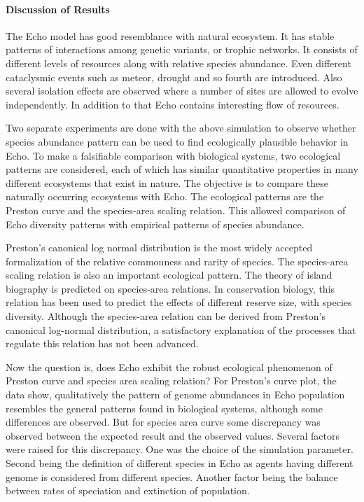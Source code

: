 \documentclass[letterpaper]{article}
\numberwithin{equation}{section}
\begin{document}
\paragraph{Discussion of Results}
The Echo model has good resemblance with natural ecosystem. It has stable patterns of interactions among genetic variants, or trophic networks. It consists of different levels of resources along with relative species abundance. Even different cataclysmic events such as meteor, drought and so fourth are introduced. Also several isolation effects are observed where a number of sites are allowed to evolve independently. In addition to that Echo contains interesting flow of resources. 

Two separate experiments are done with the above simulation to observe whether species abundance pattern can be used to find ecologically plausible behavior in Echo. To make a falsifiable comparison with biological systems, two ecological patterns are considered, each of which has similar quantitative properties in many different ecosystems that exist in nature. The objective is to compare these naturally occurring ecosystems with Echo. The ecological patterns are the Preston  curve and the species-area scaling relation. This allowed comparison of Echo diversity patterns with empirical patterns of species abundance.

Preston's canonical log normal distribution is the most widely accepted formalization of the relative commonness and rarity of species. The species-area scaling relation is also an important ecological pattern. The theory of island biography is predicted on species-area relations. In conservation biology, this relation has been used to predict the effects of different reserve size, with species diversity. Although the species-area relation can be derived from Preston's canonical log-normal distribution, a satisfactory explanation of the processes that regulate this relation has not been advanced. 

Now the question is, does Echo exhibit the robust ecological phenomenon of Preston curve and species area scaling relation? For Preston's curve plot, the data show, qualitatively the pattern of genome abundances in Echo population resembles the general patterns found in biological systems, although some differences are observed. But for species area curve some discrepancy was observed between the expected result and the observed values. Several factors were raised for this discrepancy. One was the choice of the simulation parameter. Second being the definition of different species in Echo as agents having different genome is considered from different species. Another factor being the balance between rates of speciation and extinction of population. 
\end{document}
